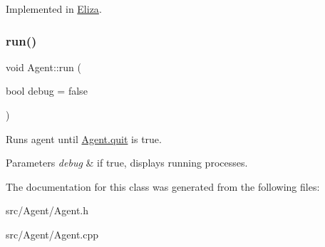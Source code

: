 Implemented in \mbox{\hyperlink{classEliza_a9700906fb44016db11cd1183d5a1f1f3}{Eliza}}.

\mbox{\label{classAgent_a5e176f9a9b2a9269506cc172c1e2b897}} 
\subsubsection{\texorpdfstring{run()}{run()}}
{\footnotesize\ttfamily void Agent\+::run (\begin{DoxyParamCaption}\item[{bool}]{debug = {\ttfamily false} }\end{DoxyParamCaption})}

Runs agent until \mbox{\hyperlink{classAgent_ac6d993fd4391bbd272be8bcdaeab350c}{Agent.\+quit}} is true. 
\begin{DoxyParams}{Parameters}
{\em debug} & if true, displays running processes. \\
\hline
\end{DoxyParams}


The documentation for this class was generated from the following files\+:\begin{DoxyCompactItemize}
\item 
src/\+Agent/Agent.\+h\item 
src/\+Agent/Agent.\+cpp\end{DoxyCompactItemize}
